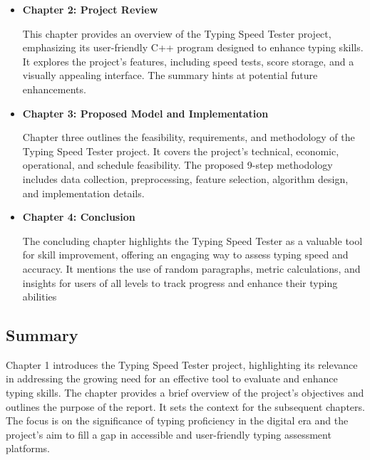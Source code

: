 \begin{itemize}
    \item {\textbf{Chapter 2: Project Review}}

This chapter provides an overview of the Typing Speed Tester project, emphasizing its user-friendly C++ program designed to enhance typing skills. It explores the project's features, including speed tests, score storage, and a visually appealing interface. The summary hints at potential future enhancements.

\item{\textbf{Chapter 3: Proposed Model and Implementation}}

Chapter three outlines the feasibility, requirements, and methodology of the Typing Speed Tester project. It covers the project's technical, economic, operational, and schedule feasibility. The proposed 9-step methodology includes data collection, preprocessing, feature selection, algorithm design, and implementation details.

\item{\textbf{Chapter 4: Conclusion}}

The concluding chapter highlights the Typing Speed Tester as a valuable tool for skill improvement, offering an engaging way to assess typing speed and accuracy. It mentions the use of random paragraphs, metric calculations, and insights for users of all levels to track progress and enhance their typing abilities
\end{itemize}



\subsection{Summary}
Chapter 1 introduces the Typing Speed Tester project, highlighting its relevance in addressing the growing need for an effective tool to evaluate and enhance typing skills. The chapter provides a brief overview of the project's objectives and outlines the purpose of the report. It sets the context for the subsequent chapters. The focus is on the significance of typing proficiency in the digital era and the project's aim to fill a gap in accessible and user-friendly typing assessment platforms.